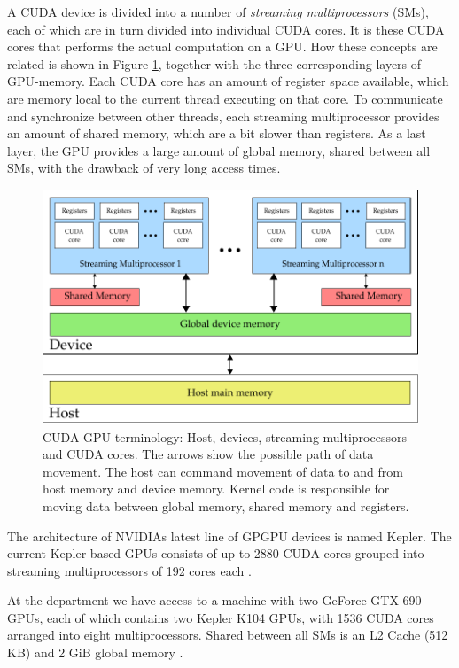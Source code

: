 A CUDA device is divided into a number of \textit{streaming
  multiprocessors} (SMs), each of which are in turn divided into
individual CUDA cores. It is these CUDA cores that performs the actual
computation on a GPU. How these concepts are related is shown in
Figure \ref{fig:gpu_terminology}, together with the three
corresponding layers of GPU-memory. Each CUDA core has an amount of
register space available, which are memory local to the current thread
executing on that core. To communicate and synchronize between other
threads, each streaming multiprocessor provides an amount of shared
memory, which are a bit slower than registers. As a last layer, the
GPU provides a large amount of global memory, shared between all SMs,
with the drawback of very long access times.

\begin{figure}
  \centering
  \includegraphics[width=\textwidth]{graphics/cuda-structure}
  \caption{CUDA GPU terminology: Host, devices, streaming
    multiprocessors and CUDA cores. The arrows show the possible path
    of data movement. The host can command movement of data to and
    from host memory and device memory. Kernel code is responsible for
    moving data between global memory, shared memory and registers.}
  \label{fig:gpu_terminology}
\end{figure}

The architecture of NVIDIAs latest line of GPGPU devices is named
Kepler. The current Kepler based GPUs consists of up to 2880 CUDA
cores grouped into streaming multiprocessors of 192
cores each \cite{nvidia2012keplerGK110}. 

At the department we have access to a machine with two GeForce GTX 690
GPUs, each of which contains two Kepler K104 GPUs, with 1536 CUDA
cores arranged into eight multiprocessors. Shared between all SMs is
an L2 Cache (512 KB) and 2 GiB global memory
\cite{nvidia2012gtx680}. 

